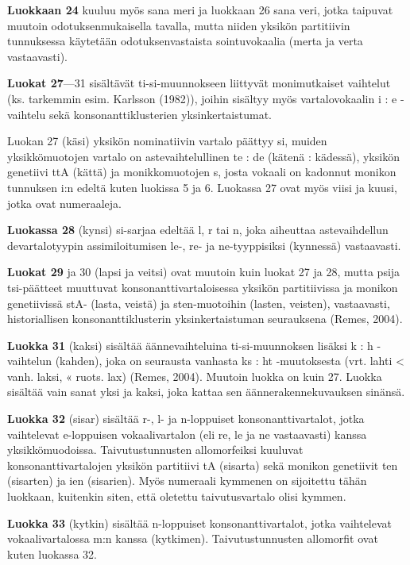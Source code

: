\documentclass[free]{flammie}
\begin{document}
\textbf{Luokkaan 24} kuuluu myös sana meri ja luokkaan 26 sana veri, jotka taipuvat
muutoin odotuksenmukaisella tavalla, mutta niiden yksikön partitiivin tunnuksessa käytetään odotuksenvastaista sointuvokaalia (merta ja verta vastaavasti).

\textbf{Luokat 27}—31 sisältävät ti-si-muunnokseen liittyvät monimutkaiset vaihtelut
(ks. tarkemmin esim. Karlsson (1982)), joihin sisältyy myös vartalovokaalin i :
e -vaihtelu sekä konsonanttiklusterien yksinkertaistumat.

Luokan 27 (käsi) yksikön nominatiivin vartalo päättyy si, muiden yksikkömuotojen vartalo on astevaihtelullinen te : de (kätenä : kädessä), yksikön genetiivi
ttA (kättä) ja monikkomuotojen s, josta vokaali on kadonnut monikon tunnuksen
i:n edeltä kuten luokissa 5 ja 6. Luokassa 27 ovat myös viisi ja kuusi, jotka ovat
numeraaleja.

\textbf{Luokassa 28} (kynsi) si-sarjaa edeltää l, r tai n, joka aiheuttaa astevaihdellun devartalotyypin assimiloitumisen le-, re- ja ne-tyyppisiksi (kynnessä) vastaavasti.

\textbf{Luokat 29} ja 30 (lapsi ja veitsi) ovat muutoin kuin luokat 27 ja 28, mutta psija tsi-päätteet muuttuvat konsonanttivartaloisessa yksikön partitiivissa ja monikon
genetiivissä stA- (lasta, veistä) ja sten-muotoihin (lasten, veisten), vastaavasti, historiallisen konsonanttiklusterin yksinkertaistuman seurauksena (Remes, 2004).

\textbf{Luokka 31} (kaksi) sisältää äännevaihteluina ti-si-muunnoksen lisäksi k : h -vaihtelun (kahden), joka on seurausta vanhasta ks : ht -muutoksesta (vrt. lahti < vanh.
laksi, « ruots. lax) (Remes, 2004). Muutoin luokka on kuin 27. Luokka sisältää
vain sanat yksi ja kaksi, joka kattaa sen äännerakennekuvauksen sinänsä.

\textbf{Luokka 32} (sisar) sisältää r-, l- ja n-loppuiset konsonanttivartalot, jotka vaihtelevat e-loppuisen vokaalivartalon (eli re, le ja ne vastaavasti) kanssa yksikkömuodoissa. Taivutustunnusten allomorfeiksi kuuluvat konsonanttivartalojen yksikön partitiivi tA (sisarta) sekä monikon genetiivit ten (sisarten) ja ien (sisarien).
Myös numeraali kymmenen on sijoitettu tähän luokkaan, kuitenkin siten, että oletettu taivutusvartalo olisi kymmen.

\textbf{Luokka 33} (kytkin) sisältää n-loppuiset konsonanttivartalot, jotka vaihtelevat vokaalivartalossa m:n kanssa (kytkimen). Taivutustunnusten allomorfit ovat kuten
luokassa 32.
\end{document}

